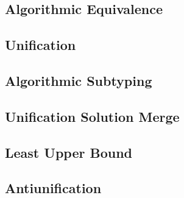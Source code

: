 \documentclass[a4,natbib=false]{article}
\begin{document}
\subsection{Algorithmic Equivalence}
\ottdefnsEOneA

\subsection{Unification}
\ottdefnsU

\subsection{Algorithmic Subtyping}
\ottdefnsA

\subsection{Unification Solution Merge}
\ottdefnsSM

\subsection{Least Upper Bound}
\ottdefnsLUB

\subsection{Antiunification}
\ottdefnsAU


% 
% 
\end{document}
